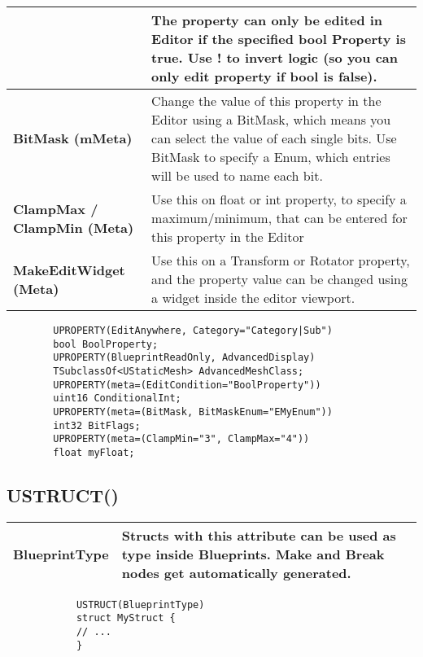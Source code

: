 \documentclass[10pt]{article}
\begin{document}
\begin{multicols*}{5}
\begin{tabularx}{\columnwidth}{|p{3.5cm}|X|}
		&  The property can only be edited in Editor if the specified bool Property is true. Use ! to invert logic (so you can only edit property if bool is false). \\
		\hline \textbf{BitMask (mMeta)}
		& Change the value of this property in the Editor using a BitMask, which means you can select the value of each single bits. Use BitMask to specify a Enum, which entries will be used to name each bit. \\
		\hline \textbf{ClampMax / ClampMin (Meta)}
		& Use this on float or int property, to specify a maximum/minimum, that can be entered for this property in the Editor \\
		\hline \textbf {MakeEditWidget (Meta)}
		& Use this on a Transform or Rotator property, and the property value can be changed using a widget inside the editor viewport. \\
		\hline
	\end{tabularx}

	\begin{minipage}{\columnwidth}
	\begin{verbatim}
		UPROPERTY(EditAnywhere, Category="Category|Sub")
		bool BoolProperty;
		UPROPERTY(BlueprintReadOnly, AdvancedDisplay)
		TSubclassOf<UStaticMesh> AdvancedMeshClass;
		UPROPERTY(meta=(EditCondition="BoolProperty"))
		uint16 ConditionalInt;
		UPROPERTY(meta=(BitMask, BitMaskEnum="EMyEnum"))
		int32 BitFlags;
		UPROPERTY(meta=(ClampMin="3", ClampMax="4"))
		float myFloat;
	\end{verbatim}
\end{minipage}

	
	\subsection{USTRUCT()}
	
	\begin{tabularx}{\columnwidth}{|p{3.5cm}|X|}
		\hline \textbf{BlueprintType}
		& Structs with this attribute can be used as type inside Blueprints. Make and Break nodes get automatically generated.\\
		\hline
	\end{tabularx}
	
	\begin{minipage}{\columnwidth}
		\begin{verbatim}
			USTRUCT(BlueprintType)
			struct MyStruct {
			// ...
			}	
		\end{verbatim}
	\end{minipage}


\end{multicols*}
\end{document}
